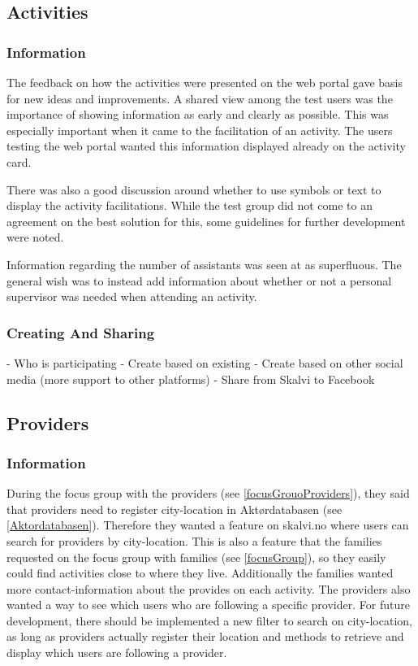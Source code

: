 \subsection{Activities}
\subsubsection{Information}
\label{UserFeedbackAboutActivities}
The feedback on how the activities were presented on the web portal gave basis for new ideas and improvements. A shared view among the test users was the importance of showing information as early and clearly as possible. This was especially important when it came to the facilitation of an activity. The users testing the web portal wanted this information displayed already on the activity card.

There was also a good discussion around whether to use symbols or text to display the activity facilitations. While the test group did not come to an agreement on the best solution for this, some guidelines for further development were noted. 

Information regarding the number of assistants was seen at as superfluous. The general wish was to instead add information about whether or not a personal supervisor was needed when attending an activity.

\subsubsection{Creating And Sharing}


- Who is participating
- Create based on existing
- Create based on other social media (more support to other platforms)
- Share from Skalvi to Facebook

\subsection{Providers}
\subsubsection{Information}
During the focus group with the providers (see \ref{focusGrouoProviders}), they said that providers need to register city-location in Aktørdatabasen (see \ref{Aktordatabasen}). Therefore they wanted a feature on skalvi.no where users can search for providers by city-location. This is also a feature that the families requested on the focus group with families (see \ref{focusGroup}), so they easily could find activities close to where they live. Additionally the families wanted more contact-information about the provides on each activity.  The providers also wanted a way to see which users who are following a specific provider.
For future development, there should be implemented a new filter to search on city-location, as long as providers actually register their location and methods to retrieve and display which users are following a provider.

